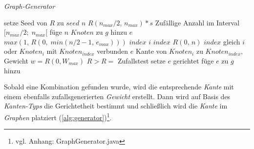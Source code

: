 \documentclass[12pt]{article}
\begin{document}
\begin{algorithm}
\caption{\textit{Graph-Generator} \label{alg:generator}}
\begin{algorithmic}[1]
\Statex
{}
\Statex
{}
	\State setze Seed von $R$ zu $seed$
	\State \sei $n$ $R(n_{max}/2,\,n_{max}) * s$ \Comment Zufällige Anzahl im Interval $\big[n_{max}/2;\;n_{max}\big[$
	\State füge $n$ $Knoten$ zu $g$ hinzu
		\State \sei $e$ $max(1,\,R(0,\;min(n/2-1,\,e_{max})))$
			\State \sei $index$ $i$
			\Repeat 
			\State \sei $index$ $R(0,\,n)$
			\Until $index$ gleich $i$ oder $Knoten_{i}$ mit $Knoten_{index}$ verbunden
			\State \sei $e$ Kante von $Knoten_{i}$ zu $Knoten_{index}$, Gewicht $w = R(0, W_{max})$
			 \State \Comment $R>R =$ Zufallstest
				\State setze $e$ gerichtet
			\EndIf
			\State füge $e$ zu $g$ hinzu
		\EndFor
	\EndFor
\EndProcedure
\end{algorithmic}
\end{algorithm}

Sobald eine Kombination gefunden wurde, wird die entsprechende \textit{Kante} mit einem ebenfalls zufallsgenerierten \textit{Gewicht} erstellt. Dann wird auf Basis des \textit{Kanten-Typs} die Gerichtetheit bestimmt und schließlich wird die \textit{Kante} im \textit{Graphen} platziert (\autoref{alg:generator})\footnote{vgl. Anhang: GraphGenerator.java}.

\clearpage
\end{document}
